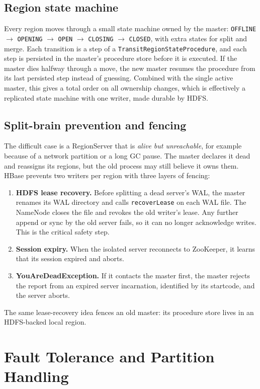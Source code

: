 \documentclass[10pt,twocolumn,letterpaper]{article}
\newcommand{\code}[1]{\texttt{\small #1}}
\begin{document}
\subsection{Region state machine}
Every region moves through a small state machine owned by the master: \code{OFFLINE} $\rightarrow$ \code{OPENING} $\rightarrow$ \code{OPEN} $\rightarrow$ \code{CLOSING} $\rightarrow$ \code{CLOSED}, with extra states for split and merge. Each transition is a step of a \code{TransitRegionStateProcedure}, and each step is persisted in the master's procedure store before it is executed. If the master dies halfway through a move, the new master resumes the procedure from its last persisted step instead of guessing. Combined with the single active master, this gives a total order on all ownership changes, which is effectively a replicated state machine with one writer, made durable by HDFS.

\subsection{Split-brain prevention and fencing}
The difficult case is a RegionServer that is \emph{alive but unreachable}, for example because of a network partition or a long GC pause. The master declares it dead and reassigns its regions, but the old process may still believe it owns them. HBase prevents two writers per region with three layers of fencing:
\begin{enumerate}
\item \textbf{HDFS lease recovery.} Before splitting a dead server's WAL, the master renames its WAL directory and calls \code{recoverLease} on each WAL file. The NameNode closes the file and revokes the old writer's lease. Any further append or sync by the old server fails, so it can no longer acknowledge writes. This is the critical safety step.
\item \textbf{Session expiry.} When the isolated server reconnects to ZooKeeper, it learns that its session expired and aborts.
\item \textbf{YouAreDeadException.} If it contacts the master first, the master rejects the report from an expired server incarnation, identified by its startcode, and the server aborts.
\end{enumerate}
The same lease-recovery idea fences an old master: its procedure store lives in an HDFS-backed local region.

\section{Fault Tolerance and Partition Handling}\label{sec:ft}
\end{document}
